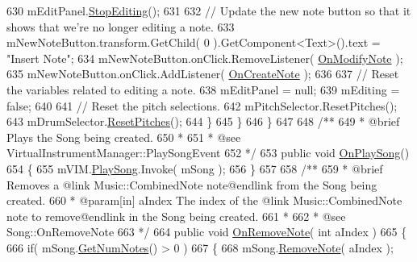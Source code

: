 \begin{DoxyCodeInclude}
630                 mEditPanel.\hyperlink{group___s_c___n_d_p_unity_ga92d0f078c4efd6c207173a10e31b5065}{StopEditing}();
631 
632                 \textcolor{comment}{// Update the new note button so that it shows that we're no longer editing a note.}
633                 mNewNoteButton.transform.GetChild( 0 ).GetComponent<Text>().text = \textcolor{stringliteral}{"Insert Note"};
634                 mNewNoteButton.onClick.RemoveListener( \hyperlink{group___s_c_m_handlers_gaf12d6326ad2175a51f688504372be784}{OnModifyNote} );
635                 mNewNoteButton.onClick.AddListener( \hyperlink{group___s_c_m_handlers_gaed512eb78e060a40616e6e31ce029440}{OnCreateNote} );
636 
637                 \textcolor{comment}{// Reset the variables related to editing a note.}
638                 mEditPanel = null;
639                 mEditing = \textcolor{keyword}{false};
640 
641                 \textcolor{comment}{// Reset the pitch selections.}
642                 mPitchSelector.ResetPitches();
643                 mDrumSelector.\hyperlink{group___s_c___p_s_c_pub_func_ga678ef561c5418e4bf43a5f9ed753f0f0}{ResetPitches}();
644             \}
645         \}
646     \}
647 \textcolor{comment}{}
648 \textcolor{comment}{    /**}
649 \textcolor{comment}{     * @brief Plays the Song being created.}
650 \textcolor{comment}{     * }
651 \textcolor{comment}{     * @see VirtualInstrumentManager::PlaySongEvent}
652 \textcolor{comment}{    */}
653     \textcolor{keyword}{public} \textcolor{keywordtype}{void} \hyperlink{group___s_c_m_handlers_gafb394a0b00c8f9c0959d901faf9131c7}{OnPlaySong}()
654     \{
655         mVIM.\hyperlink{group___v_i_m_events_gae450bdba9c513ab4e43f69def50fa84d}{PlaySong}.Invoke( mSong );
656     \}
657 \textcolor{comment}{}
658 \textcolor{comment}{    /**}
659 \textcolor{comment}{     * @brief Removes a @link Music::CombinedNote note@endlink from the Song being created.}
660 \textcolor{comment}{     * @param[in] aIndex The index of the @link Music::CombinedNote note to remove@endlink in the Song
       being created.}
661 \textcolor{comment}{     * }
662 \textcolor{comment}{     * @see Song::OnRemoveNote}
663 \textcolor{comment}{    */}
664     \textcolor{keyword}{public} \textcolor{keywordtype}{void} \hyperlink{group___s_c_m_handlers_ga1f1e9a15a6c339282fb94085d4862605}{OnRemoveNote}( \textcolor{keywordtype}{int} aIndex )
665     \{
666         \textcolor{keywordflow}{if}( mSong.\hyperlink{group___song_pub_func_gad124d0af146885327f8ac455bc013b63}{GetNumNotes}() > 0 )
667         \{
668             mSong.\hyperlink{group___song_pub_func_ga856634e047b8c35160958c3aa53d6b28}{RemoveNote}( aIndex );

\end{DoxyCodeInclude}
